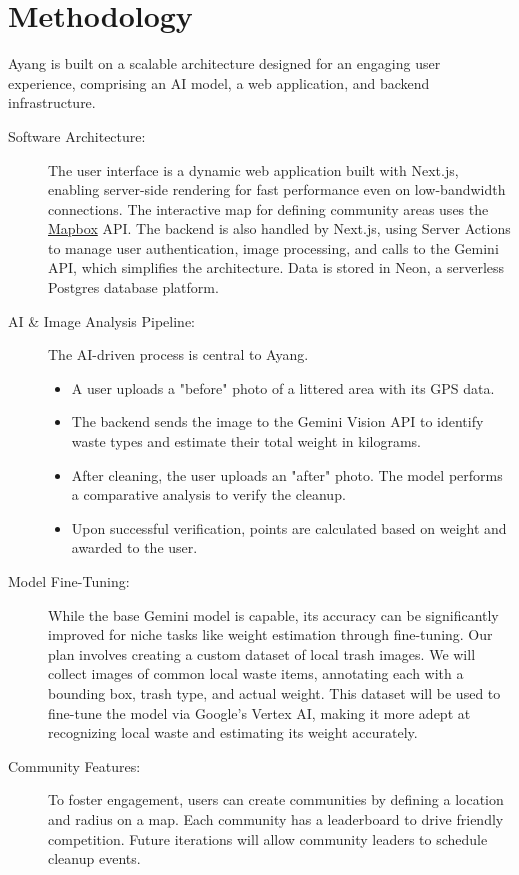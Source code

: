 \chapter[Methodology]{Methodology}
\label{cp:Methodology}

{
	\parindent0pt
	Ayang is built on a scalable architecture designed for an engaging user experience, comprising an AI model, a web application, and backend infrastructure.

	\begin{description}
		\item[Software Architecture:]

		      The user interface is a dynamic web application built with Next.js, enabling server-side rendering for fast performance even on low-bandwidth connections. The interactive map for defining community areas uses the  \href{https://www.mapbox.com}{Mapbox} API. The backend is also handled by Next.js, using Server Actions to manage user authentication, image processing, and calls to the Gemini API, which simplifies the architecture. Data is stored in Neon, a serverless Postgres database platform.


		\item[AI \& Image Analysis Pipeline:]  The AI-driven process is central to Ayang.

		      \begin{itemize}
			      \item A user uploads a "before" photo of a littered area with its GPS data.
			      \item The backend sends the image to the Gemini Vision API to identify waste types and estimate their total weight in kilograms.
			      \item After cleaning, the user uploads an "after" photo. The model performs a comparative analysis to verify the cleanup.
			      \item Upon successful verification, points are calculated based on weight and awarded to the user.
		      \end{itemize}

		\item[Model Fine-Tuning:] While the base Gemini model is capable, its accuracy can be significantly improved for niche tasks like weight estimation through fine-tuning. Our plan involves creating a custom dataset of local trash images. We will collect images of common local waste items, annotating each with a bounding box, trash type, and actual weight. This dataset will be used to fine-tune the model via Google's Vertex AI, making it more adept at recognizing local waste and estimating its weight accurately.

		\item[Community Features: ] To foster engagement, users can create communities by defining a location and radius on a map. Each community has a leaderboard to drive friendly competition. Future iterations will allow community leaders to schedule cleanup events.

	\end{description}

}